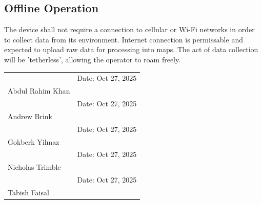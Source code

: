 \documentclass[11pt]{article}
\begin{document}
        \subsection{Offline Operation}
            The device shall not require a connection to cellular or Wi-Fi networks in order to collect data from its environment. Internet connection is permissable and expected to upload raw data for processing into maps. The act of data collection will be 'tetherless', allowing the operator to roam freely.
	\newpage
	\noindent
	\begin{tabular}{ll}
		\makebox[2.5in]{\hrulefill} & Date: Oct 27, 2025\\
		Abdul Rahim Khan \\[8ex]
		\makebox[2.5in]{\hrulefill} & Date: Oct 27, 2025\\
		Andrew Brink \\[8ex]
		\makebox[2.5in]{\hrulefill} & Date: Oct 27, 2025\\
		Gokberk Yilmaz \\[8ex]
		\makebox[2.5in]{\hrulefill} & Date: Oct 27, 2025\\
		Nicholas Trimble\\[8ex]
		\makebox[2.5in]{\hrulefill} & Date: Oct 27, 2025\\
		Tabish Faisal \\[8ex]
	\end{tabular}
        
\end{document}
